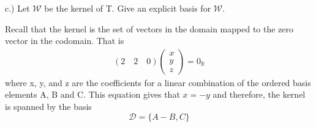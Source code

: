 \documentclass[a4paper, 11pt]{article}
\newcommand{\R}{\mathbb{R}}
\newenvironment{solution}{%
	\begin{list}{}{%
			\setlength{\topsep}{0pt}%
			\setlength{\leftmargin}{1.5cm}%
			\setlength{\rightmargin}{1.5cm}%
			\setlength{\listparindent}{\parindent}%
			\setlength{\itemindent}{\parindent}%
			\setlength{\parsep}{\parskip}%
		}%
		\item[]}{\end{list}}
\begin{document}
\noindent c.) Let $\mathcal{W}$ be the kernel of T. Give an explicit basis for $\mathcal{W}$. \\
	\begin{solution}
		\noindent Recall that the kernel is the set of vectors in the domain mapped to the zero vector in the codomain. That is 
			\begin{align*}
				(2\quad 2\quad 0) \begin{pmatrix}x \\ y \\ z \end{pmatrix} = 0_\R
			\end{align*}
		where x, y, and z are the coefficients for a linear combination of the ordered basis elements A, B and C. This equation gives that $x=-y$ and therefore, the kernel is spanned by the basis 
			\begin{equation}
				\mathcal{D} = \{ A-B, C\} 
			\end{equation}
	\end{solution}
\end{document}
